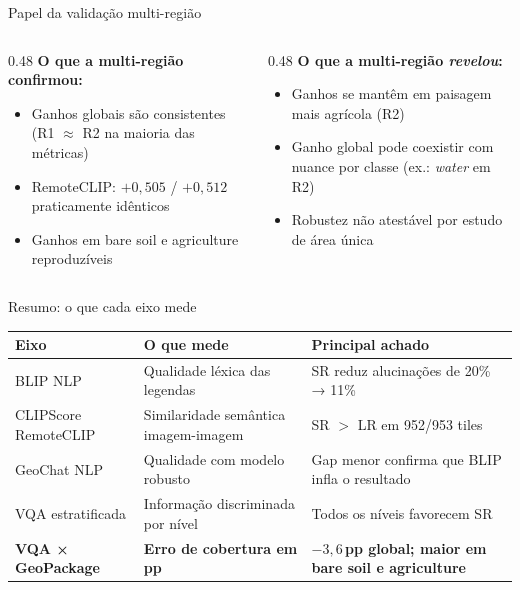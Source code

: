 \documentclass[aspectratio=169]{beamer}
\begin{document}
\begin{frame}{Papel da validação multi-região}

  \begin{columns}[T]
    \begin{column}{0.48\textwidth}
      \textbf{O que a multi-região confirmou:}
      \begin{itemize}
        \item Ganhos globais são consistentes (R1 $\approx$ R2 na maioria das métricas)
        \item RemoteCLIP: $+0{,}505$ / $+0{,}512$ praticamente idênticos
        \item Ganhos em bare soil e agriculture reproduzíveis
      \end{itemize}
    \end{column}
    \begin{column}{0.48\textwidth}
      \textbf{O que a multi-região \emph{revelou}:}
      \begin{itemize}
        \item Ganhos se mantêm em paisagem mais agrícola (R2)
        \item Ganho global pode coexistir com nuance por classe (ex.: \textit{water} em R2)
        \item Robustez não atestável por estudo de área única
      \end{itemize}
    \end{column}
  \end{columns}

  \vspace{0.5em}

\end{frame}

\begin{frame}{Resumo: o que cada eixo mede}

  \begin{tabular}{p{3cm}p{4.5cm}p{5cm}}
    \toprule
    \textbf{Eixo} & \textbf{O que mede} & \textbf{Principal achado} \\
    \midrule
    BLIP NLP & Qualidade léxica das legendas & SR reduz alucinações de 20\% → 11\% \\[0.3em]
    CLIPScore RemoteCLIP & Similaridade semântica imagem-imagem & SR $>$ LR em 952/953 tiles \\[0.3em]
    GeoChat NLP & Qualidade com modelo robusto & Gap menor confirma que BLIP infla o resultado \\[0.3em]
    VQA estratificada & Informação discriminada por nível & Todos os níveis favorecem SR \\[0.3em]
    \textbf{VQA × GeoPackage} & \textbf{Erro de cobertura em pp} & \textbf{$-3{,}6$\,pp global; maior em bare soil e agriculture} \\
    \bottomrule
  \end{tabular}

\end{frame}
\end{document}
